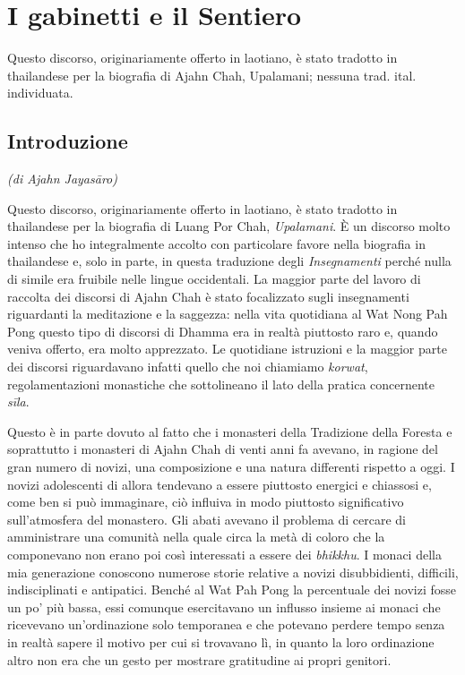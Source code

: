 \chapter{I gabinetti e il Sentiero}

\begin{openingQuote}
  \centering

  Questo discorso, originariamente offerto in laotiano, è stato tradotto in
  thailandese per la biografia di Ajahn Chah, Upalamani; nessuna trad.
  ital. individuata.
\end{openingQuote}

\section{Introduzione}

\emph{(di Ajahn Jayasāro)}

Questo discorso,
originariamente offerto in laotiano, è stato tradotto in thailandese per
la biografia di Luang Por Chah, \emph{Upalamani}. È un discorso molto
intenso che ho integralmente accolto con particolare favore nella
biografia in thailandese e, solo in parte, in questa traduzione degli
\emph{Insegnamenti} perché nulla di simile era fruibile nelle lingue
occidentali. La maggior parte del lavoro di raccolta dei discorsi di
Ajahn Chah è stato focalizzato sugli insegnamenti riguardanti la
meditazione e la saggezza: nella vita quotidiana al Wat Nong Pah Pong
questo tipo di discorsi di Dhamma era in realtà piuttosto raro e, quando
veniva offerto, era molto apprezzato. Le quotidiane istruzioni e la
maggior parte dei discorsi riguardavano infatti quello che noi chiamiamo
\emph{korwat}, regolamentazioni monastiche che sottolineano il lato
della pratica concernente \emph{sīla}.

Questo è in parte dovuto al fatto che i monasteri della Tradizione della
Foresta e soprattutto i monasteri di Ajahn Chah di venti anni fa
avevano, in ragione del gran numero di novizi, una composizione e una
natura differenti rispetto a oggi. I novizi adolescenti di allora
tendevano a essere piuttosto energici e chiassosi e, come ben si può
immaginare, ciò influiva in modo piuttosto significativo sull'atmosfera
del monastero. Gli abati avevano il problema di cercare di amministrare
una comunità nella quale circa la metà di coloro che la componevano non
erano poi così interessati a essere dei \emph{bhikkhu}. I monaci della
mia generazione conoscono numerose storie relative a novizi
disubbidienti, difficili, indisciplinati e antipatici. Benché al Wat Pah
Pong la percentuale dei novizi fosse un po' più bassa, essi comunque
esercitavano un influsso insieme ai monaci che ricevevano un'ordinazione
solo temporanea e che potevano perdere tempo senza in realtà sapere il
motivo per cui si trovavano lì, in quanto la loro ordinazione altro non
era che un gesto per mostrare gratitudine ai propri genitori.

